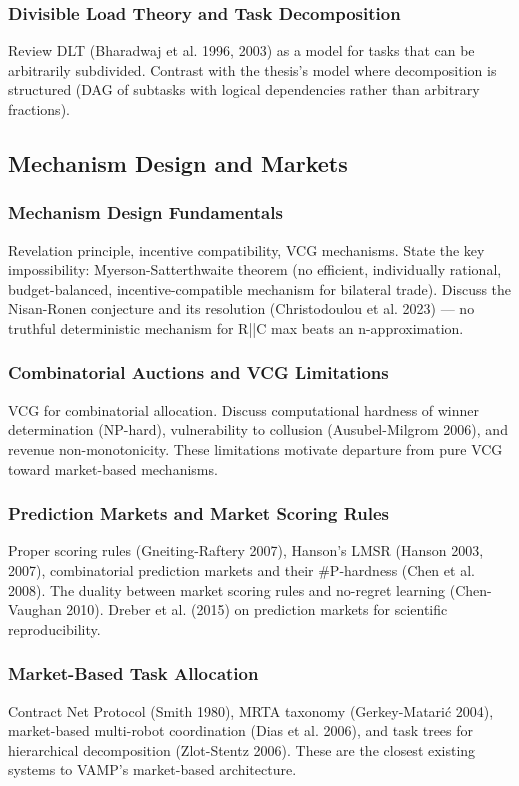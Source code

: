 \subsubsection{Divisible Load Theory and Task Decomposition}
Review DLT (Bharadwaj et al. 1996, 2003) as a model for tasks that can be arbitrarily subdivided. Contrast with the thesis's model where decomposition is structured (DAG of subtasks with logical dependencies rather than arbitrary fractions).

\subsection{Mechanism Design and Markets}
\subsubsection{Mechanism Design Fundamentals}
Revelation principle, incentive compatibility, VCG mechanisms. State the key impossibility: Myerson-Satterthwaite theorem (no efficient, individually rational, budget-balanced, incentive-compatible mechanism for bilateral trade). Discuss the Nisan-Ronen conjecture and its resolution (Christodoulou et al. 2023) — no truthful deterministic mechanism for R||C max beats an n-approximation.

\subsubsection{Combinatorial Auctions and VCG Limitations}
VCG for combinatorial allocation. Discuss computational hardness of winner determination (NP-hard), vulnerability to collusion (Ausubel-Milgrom 2006), and revenue non-monotonicity. These limitations motivate departure from pure VCG toward market-based mechanisms.

\subsubsection{Prediction Markets and Market Scoring Rules}
Proper scoring rules (Gneiting-Raftery 2007), Hanson's LMSR (Hanson 2003, 2007), combinatorial prediction markets and their \#P-hardness (Chen et al. 2008). The duality between market scoring rules and no-regret learning (Chen-Vaughan 2010). Dreber et al. (2015) on prediction markets for scientific reproducibility.

\subsubsection{Market-Based Task Allocation}
Contract Net Protocol (Smith 1980), MRTA taxonomy (Gerkey-Matarić 2004), market-based multi-robot coordination (Dias et al. 2006), and task trees for hierarchical decomposition (Zlot-Stentz 2006). These are the closest existing systems to VAMP's market-based architecture.

